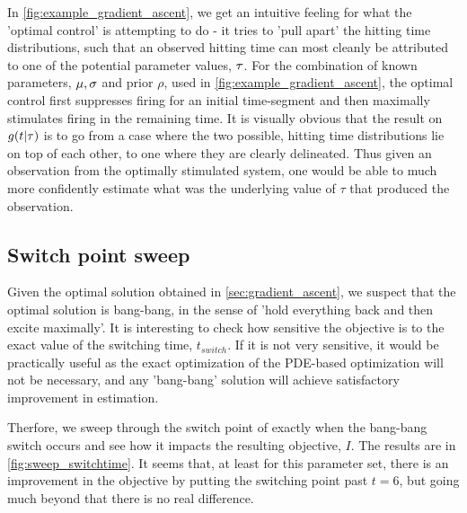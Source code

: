 \documentclass{article}
\begin{document}
In \cref{fig:example_gradient_ascent}, we get an intuitive 
feeling for what the 'optimal control' is attempting to do - it tries to
'pull apart' the hitting time distributions, such that an observed hitting time
can most cleanly be attributed to one of the potential parameter values, ${\tau}$.
For the combination of known parameters, ${\mu }, {\sigma }$ and prior $\rho$, used in
\cref{fig:example_gradient_ascent}, the optimal control first suppresses firing
for an initial time-segment and then maximally stimulates firing in the
remaining time. 
It is visually obvious that the result on $g(t|{ \tau })$ is to go
from a case where the two possible, hitting time distributions lie on top of each other, to one where they are clearly
delineated. Thus given an observation from the optimally stimulated system, one
would be able to much more confidently estimate what was the underlying value of
$\tau$ that produced the observation. 

\subsection{Switch point sweep}
Given the optimal solution obtained in \cref{sec:gradient_ascent}, we suspect
that the optimal solution is bang-bang, in the sense of 'hold  everything back
and then excite maximally'. It is interesting to check how sensitive the
objective is to the exact value of the switching time, $t_{switch}$. If it is
not very sensitive, it would be practically useful as the exact
optimization of the PDE-based optimization will not be
necessary, and any 'bang-bang' solution will achieve satisfactory improvement in
estimation. 

Therfore, we sweep through the switch point of exactly when the
bang-bang switch occurs and see how it impacts the resulting objective, $I$.
The results are in \cref{fig:sweep_switchtime}. It seems that, at least for this
parameter set, there is an improvement in the objective by putting the switching
point past $t=6$, but going much beyond that there is no real difference. 
\end{document}
